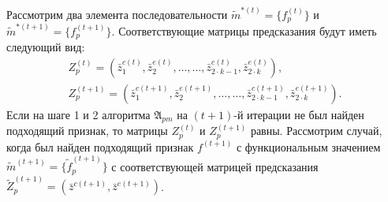 \begin{Proof}
	Рассмотрим два элемента последовательности $\tilde m^{*(t)}=\{f_p^{(t)}\}$ и $\tilde m^{*(t+1)}=\{f_p^{(t+1)}\}$. Соответствующие матрицы предсказания будут иметь следующий вид:
	\begin{eqnarray}
		Z_p^{(t)}=(\bar z_1^{c(t)},\bar z_2^{e(t)},\dots,\dots,\bar z_{2\cdot k-1}^{c(t)},\bar z_{2\cdot k}^{e(t)}),\\
		Z_p^{(t+1)}=(\bar z_1^{c(t+1)},\bar z_2^{e(t+1)},\dots,\dots,\bar z_{2\cdot k-1}^{c(t+1)},\bar z_{2\cdot k}^{e(t+1)}).
	\end{eqnarray}
	Если на шаге 1 и 2 алгоритма $\mathfrak A_{pm}$ на $(t+1)$-й итерации не был найден подходящий признак, то матрицы $Z_p^{(t)}$ и $Z_p^{(t+1)}$ равны. Рассмотрим случай, когда был найден подходящий признак $f^{(t+1)}$ с функциональным значением $\tilde m^{(t+1)}=\{\tilde f_p^{(t+1)}\}$ с соответствующей матрицей предсказания $\tilde Z_p^{(t+1)}=(\bar z^{c(t+1)},\bar z^{e(t+1)})$.
	

\end{Proof}
